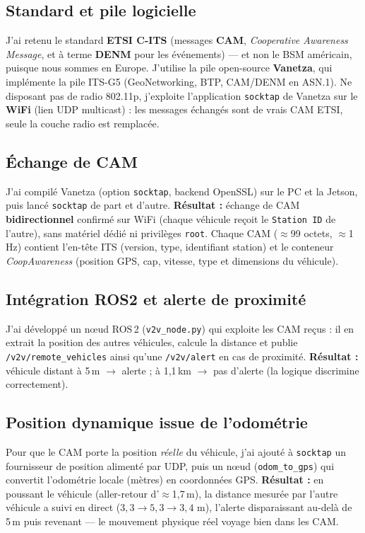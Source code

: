 \documentclass[a4paper,11pt]{article}
\begin{document}
\subsection{Standard et pile logicielle}
J'ai retenu le standard \textbf{ETSI C-ITS} (messages \textbf{CAM}, \emph{Cooperative
Awareness Message}, et à terme \textbf{DENM} pour les événements) --- et non le BSM
américain, puisque nous sommes en Europe. J'utilise la pile open-source
\textbf{Vanetza}, qui implémente la pile ITS-G5 (GeoNetworking, BTP, CAM/DENM en
ASN.1). Ne disposant pas de radio 802.11p, j'exploite l'application
\texttt{socktap} de Vanetza sur le \textbf{WiFi} (lien UDP multicast) : les messages
échangés sont de vrais CAM ETSI, seule la couche radio est remplacée.

\subsection{Échange de CAM}
J'ai compilé Vanetza (option \texttt{socktap}, backend OpenSSL) sur le PC et la
Jetson, puis lancé \texttt{socktap} de part et d'autre. \textbf{Résultat :} échange
de CAM \textbf{bidirectionnel} confirmé sur WiFi (chaque véhicule reçoit le
\texttt{Station ID} de l'autre), sans matériel dédié ni privilèges \texttt{root}.
Chaque CAM ($\approx$99 octets, $\approx$1 Hz) contient l'en-tête ITS (version,
type, identifiant station) et le conteneur \emph{CoopAwareness} (position GPS,
cap, vitesse, type et dimensions du véhicule).

\subsection{Intégration ROS2 et alerte de proximité}
J'ai développé un n{\oe}ud ROS\,2 (\texttt{v2v\_node.py}) qui exploite les CAM
reçus : il en extrait la position des autres véhicules, calcule la distance et
publie \texttt{/v2v/remote\_vehicles} ainsi qu'une \texttt{/v2v/alert} en cas de
proximité. \textbf{Résultat :} véhicule distant à 5\,m $\rightarrow$ alerte ; à
1,1\,km $\rightarrow$ pas d'alerte (la logique discrimine correctement).

\subsection{Position dynamique issue de l'odométrie}
Pour que le CAM porte la position \emph{réelle} du véhicule, j'ai ajouté à
\texttt{socktap} un fournisseur de position alimenté par UDP, puis un n{\oe}ud
(\texttt{odom\_to\_gps}) qui convertit l'odométrie locale (mètres) en coordonnées
GPS. \textbf{Résultat :} en poussant le véhicule (aller-retour d'$\approx$1,7\,m),
la distance mesurée par l'autre véhicule a suivi en direct
($3{,}3 \rightarrow 5{,}3 \rightarrow 3{,}4$ m), l'alerte disparaissant au-delà de
5\,m puis revenant --- le mouvement physique réel voyage bien dans les CAM.
\end{document}
